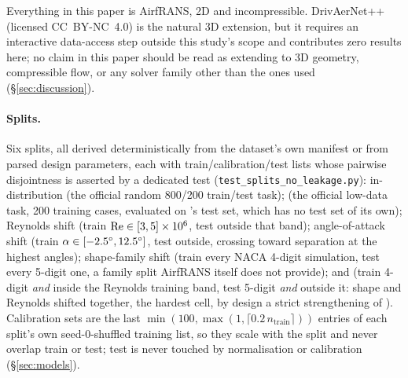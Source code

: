 Everything in this paper is AirfRANS, 2D and incompressible.
DrivAerNet++ \citep{elrefaie2024drivaernetpp} (licensed CC~BY-NC~4.0) is the
natural 3D extension, but it requires an interactive data-access step outside
this study's scope and contributes zero results here; no claim in this paper
should be read as extending to 3D geometry, compressible flow, or any solver
family other than the ones used (\S\ref{sec:discussion}).

\paragraph{Splits.} Six splits, all derived deterministically from the dataset's
own manifest or from parsed design parameters, each with train/calibration/test
lists whose pairwise disjointness is asserted by a dedicated test
(\texttt{test\_splits\_no\_leakage.py}): in-distribution 
(the official random 800/200 train/test task);  (the official
low-data task, 200 training cases, evaluated on 's test set,
which has no test set of its own); Reynolds shift  (train
$\mathrm{Re}\in[3,5]\times10^6$, test outside that band); angle-of-attack shift
 (train $\alpha\in[-2.5^{\circ},12.5^{\circ}]$, test outside,
crossing toward separation at the highest angles); shape-family shift
 (train every NACA 4-digit simulation, test every 5-digit
one, a family split AirfRANS itself does not provide); and 
(train 4-digit \emph{and} inside the Reynolds training band, test 5-digit
\emph{and} outside it: shape and Reynolds shifted together, the hardest cell,
by design a strict strengthening of ). Calibration sets are
the last $\min(100, \max(1,\lceil 0.2\,n_{\text{train}}\rceil))$ entries of
each split's own seed-0-shuffled training list, so they scale with the split
and never overlap train or test; test is never touched by normalisation or
calibration (\S\ref{sec:models}).


